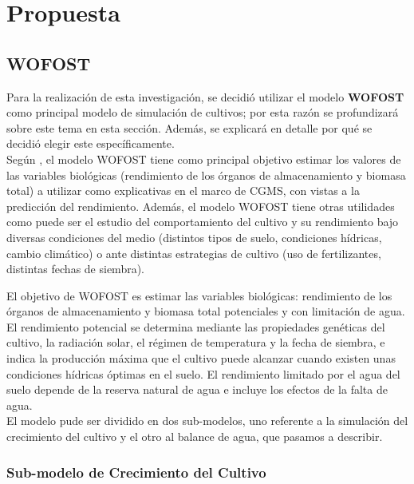 \chapter{Propuesta}\label{chapter:proposal}

\section{WOFOST}

Para la realización de esta investigación, se decidió utilizar el modelo \textbf{WOFOST} como principal modelo de simulación de cultivos; por esta razón se profundizará sobre este tema en esta sección. Además, se explicará en detalle por qué se decidió elegir este específicamente.\\

Según \parencite{sebem2005aportaciones}, el modelo WOFOST tiene como principal objetivo estimar los valores de las variables biológicas (rendimiento de los órganos de almacenamiento y biomasa total) a utilizar como explicativas en el marco de CGMS, con vistas a la predicción del rendimiento. Además, el modelo WOFOST tiene otras utilidades como puede ser el estudio del comportamiento del cultivo y su rendimiento bajo diversas condiciones del medio (distintos tipos de suelo, condiciones hídricas, cambio climático) o ante distintas estrategias de cultivo (uso de fertilizantes, distintas fechas de siembra).

El objetivo de WOFOST es estimar las variables biológicas: rendimiento de los órganos de almacenamiento y biomasa total potenciales y con limitación de agua. El rendimiento potencial se determina mediante las propiedades genéticas del cultivo, la radiación solar, el régimen de temperatura y la fecha de siembra, e indica la producción máxima que el cultivo puede alcanzar cuando existen unas condiciones hídricas óptimas en el suelo. El rendimiento limitado por el agua del suelo depende de la reserva natural de agua e incluye los efectos de la falta de agua.\\

El modelo pude ser dividido en dos sub-modelos, uno referente a la simulación del crecimiento del cultivo y el otro al balance de agua, que pasamos a describir.\parencite{sebem2005aportaciones}

\subsection{Sub-modelo de Crecimiento del Cultivo \parencite{sebem2005aportaciones}} 

